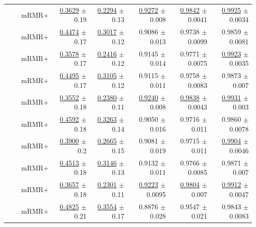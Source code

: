 \begin{longtable}{llp{}rrrrr}
 &  & mRMR+ & \underline{0.3629} {\scriptsize $\pm$ 0.19} & \underline{0.2294} {\scriptsize $\pm$ 0.13} & \underline{0.9272} {\scriptsize $\pm$ 0.008} & \underline{0.9842} {\scriptsize $\pm$ 0.0041} & \underline{0.9925} {\scriptsize $\pm$ 0.0034} \\
 &  & mRMR+ & \underline{0.4474} {\scriptsize $\pm$ 0.17} & \underline{0.3017} {\scriptsize $\pm$ 0.12} & 0.9086 {\scriptsize $\pm$ 0.013} & 0.9738 {\scriptsize $\pm$ 0.0099} & 0.9859 {\scriptsize $\pm$ 0.0081} \\
 &  & mRMR+ & \underline{0.3578} {\scriptsize $\pm$ 0.17} & \underline{0.2416} {\scriptsize $\pm$ 0.12} & 0.9145 {\scriptsize $\pm$ 0.014} & 0.9771 {\scriptsize $\pm$ 0.0075} & \underline{0.9923} {\scriptsize $\pm$ 0.0035} \\
 &  & mRMR+ & \underline{0.4495} {\scriptsize $\pm$ 0.17} & \underline{0.3105} {\scriptsize $\pm$ 0.12} & 0.9115 {\scriptsize $\pm$ 0.011} & 0.9758 {\scriptsize $\pm$ 0.0083} & 0.9873 {\scriptsize $\pm$ 0.007} \\
 &  & mRMR+ & \underline{0.3552} {\scriptsize $\pm$ 0.18} & \underline{0.2380} {\scriptsize $\pm$ 0.11} & \underline{0.9240} {\scriptsize $\pm$ 0.008} & \underline{0.9838} {\scriptsize $\pm$ 0.0043} & \underline{0.9931} {\scriptsize $\pm$ 0.003} \\
 &  & mRMR+ & \underline{0.4592} {\scriptsize $\pm$ 0.18} & \underline{0.3263} {\scriptsize $\pm$ 0.14} & 0.9050 {\scriptsize $\pm$ 0.016} & 0.9716 {\scriptsize $\pm$ 0.011} & 0.9860 {\scriptsize $\pm$ 0.0078} \\
 &  & mRMR+ & \underline{0.3900} {\scriptsize $\pm$ 0.2} & \underline{0.2665} {\scriptsize $\pm$ 0.15} & 0.9081 {\scriptsize $\pm$ 0.019} & 0.9715 {\scriptsize $\pm$ 0.011} & \underline{0.9904} {\scriptsize $\pm$ 0.0046} \\
 &  & mRMR+ & \underline{0.4513} {\scriptsize $\pm$ 0.18} & \underline{0.3146} {\scriptsize $\pm$ 0.13} & 0.9132 {\scriptsize $\pm$ 0.011} & 0.9766 {\scriptsize $\pm$ 0.0085} & 0.9871 {\scriptsize $\pm$ 0.007} \\
 &  & mRMR+ & \underline{0.3657} {\scriptsize $\pm$ 0.18} & \underline{0.2301} {\scriptsize $\pm$ 0.11} & \underline{0.9223} {\scriptsize $\pm$ 0.0095} & \underline{0.9804} {\scriptsize $\pm$ 0.007} & \underline{0.9912} {\scriptsize $\pm$ 0.0047} \\
 &  & mRMR+ & \underline{0.4825} {\scriptsize $\pm$ 0.21} & \underline{0.3554} {\scriptsize $\pm$ 0.17} & 0.8876 {\scriptsize $\pm$ 0.028} & 0.9547 {\scriptsize $\pm$ 0.021} & 0.9843 {\scriptsize $\pm$ 0.0083} \\

\end{longtable}
